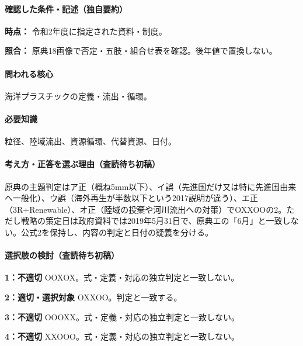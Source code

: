 \paragraph{確認した条件・記述（独自要約）}\mbox{}\par

\noindent\textbf{時点：} 令和2年度に指定された資料・制度。\par

\noindent\textbf{照合：} 原典18画像で否定・五肢・組合せ表を確認。後年値で置換しない。\par

\paragraph{問われる核心} 海洋プラスチックの定義・流出・循環。

\paragraph{必要知識} 粒径、陸域流出、資源循環、代替資源、日付。

\paragraph{考え方・正答を選ぶ理由（査読待ち初稿）} 原典の主題判定はア正（概ね5mm以下）、イ誤（先進国だけ又は特に先進国由来へ一般化）、ウ誤（海外再生が半数以下という2017説明が違う）、エ正（3R+Renewable）、オ正（陸域の投棄や河川流出への対策）でOXXOOの2。ただし戦略の策定日は政府資料では2019年5月31日で、原典エの「6月」と一致しない。公式2を保持し、内容の判定と日付の疑義を分ける。

\paragraph{選択肢の検討（査読待ち初稿）}\mbox{}\par

\noindent\textbf{1：不適切} OOXOX。式・定義・対応の独立判定と一致しない。\par

\noindent\textbf{2：適切・選択対象} OXXOO。判定と一致する。\par

\noindent\textbf{3：不適切} OOOXX。式・定義・対応の独立判定と一致しない。\par

\noindent\textbf{4：不適切} XXOOO。式・定義・対応の独立判定と一致しない。\par

